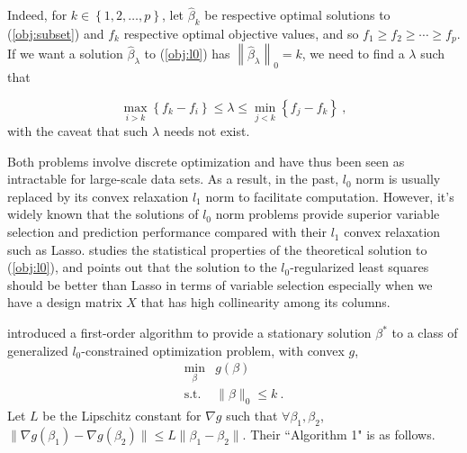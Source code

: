 \documentclass[11pt]{article}%
\numberwithin{equation}{section}
\theoremstyle{plain}
\begin{document}
Indeed, for $k \in \left\{1, 2, \ldots, p\right\}$, let $\hat\beta_k$ be respective optimal solutions to (\ref{obj:subset}) and $f_k$ respective optimal objective values, and so $f_1 \geq f_2 
\geq \cdots \geq f_p$.  If we want a solution $\hat\beta_\lambda$ to (\ref{obj:l0}) has $\left\|\hat\beta_\lambda\right\|_0 = k$, we need to find a $\lambda$ such that

$$
\max\limits_{i > k}\left\{f_k - f_i\right\} \leq \lambda \leq \min\limits_{j < k}\left\{f_j - f_k\right\} \ ,
$$
with the caveat that such $\lambda$ needs not exist.

Both problems involve discrete optimization and have thus been seen as intractable for large-scale data sets.  As a result, in the past, $l_0$ norm is usually replaced by its convex relaxation $l_1$ norm to facilitate computation.  However, it's widely known that the solutions of $l_0$ norm problems provide superior variable selection and prediction performance compared with their $l_1$ convex relaxation such as Lasso.  \cite{zhang2014lower} studies the statistical properties of the theoretical solution to (\ref{obj:l0}), and points out that the solution to the $l_0$-regularized least squares should be better than Lasso in terms of variable selection especially when we have a design matrix $X$ that has high collinearity among its columns.

\cite{bertsimas2016} introduced a first-order algorithm to provide a stationary solution $\beta^*$ to a class of generalized $l_0$-constrained optimization problem, with convex $g$,
\begin{equation}
  \label{eq:gen}
  \begin{array}{rl}
\min\limits_{\beta} & g(\beta)\\
\text{s.t.} & \|\beta\|_0 \leq k \ .
  \end{array}
\end{equation}
Let $L$ be the Lipschitz constant for $\nabla g$ such that $\forall\beta_1, \beta_2$, $\|\nabla g(\beta_1) - \nabla g(\beta_2)\| \leq L \|\beta_1  - \beta_2\|$.  Their ``Algorithm 1" is as follows.
\end{document}
